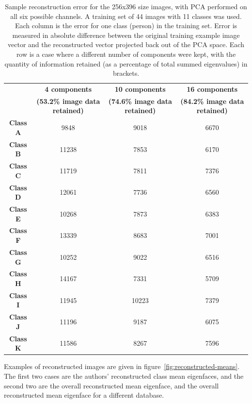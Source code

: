 \begin{table}[h!]
  \centering
  \begin{tabular}{c c c c}
    \toprule
    \textbf{ } & \textbf{4 components} & \textbf{10 components} & \textbf{16 components} \\
    \textbf{ } & \textbf{(53.2\% image data retained)} & \textbf{(74.6\% image data retained)} & \textbf{(84.2\% image data retained)} \\
    \midrule
    \textbf{Class A} & 9848 & 9018 & 6670\\
    \textbf{Class B} & 11238 & 7853 & 6170\\ 
    \textbf{Class C} & 11719 & 7811 & 7376\\ 
    \textbf{Class D} & 12061 & 7736 & 6560\\
    \textbf{Class E} & 10268 & 7873 & 6383\\
    \textbf{Class F} & 13339 & 8683 & 7001\\ 
    \textbf{Class G} & 10252 & 9022 & 6516\\ 
    \textbf{Class H} & 14167 & 7331 & 5709\\
    \textbf{Class I} & 11945 & 10223 & 7379\\
    \textbf{Class J} & 11196 & 9187 & 6075\\ 
    \textbf{Class K} & 11586 & 8267 & 7596\\
    \bottomrule
  \end{tabular}
  \caption[Sample reconstruction error for the 256x396 size images]{Sample reconstruction error for the 256x396 size images, with PCA performed on all six possible channels. A training set of 44 images with 11 classes was used. Each column is the error for one class (person) in the training set. Error is measured in absolute difference between the original training example image vector and the reconstructed vector projected back out of the PCA space. Each row is a case where a different number of components were kept, with the quantity of information retained (as a percentage of total summed eigenvalues) in brackets.}
  \label{tbl:face-rec-2}
\end{table}

Examples of reconstructed images are given in figure~\ref{fig:reconstructed-means}. The first two cases are the authors' reconstructed class mean eigenfaces, and the second two are the overall reconstructed mean eigenface, and the overall reconstructed mean eigenface for a different database.

